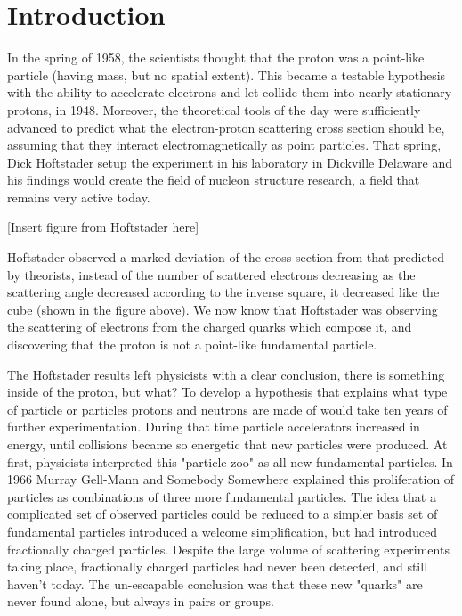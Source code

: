 \chapter{Introduction}

In the spring of 1958, the scientists thought that the proton was a point-like particle (having mass, but no spatial extent).  This became a testable hypothesis with the ability to accelerate electrons and let collide them into nearly stationary protons, in 1948.  Moreover, the theoretical tools of the day were sufficiently advanced to predict what the electron-proton scattering cross section should be, assuming that they interact electromagnetically as point particles.  That spring, Dick Hoftstader setup the experiment in his laboratory in Dickville Delaware and his findings would create the field of nucleon structure research, a field that remains very active today.

[Insert figure from Hoftstader here]

Hoftstader observed a marked deviation of the cross section from that predicted by theorists, instead of the number of scattered electrons decreasing as the scattering angle decreased according to the inverse square, it decreased like the cube (shown in the figure above).  We now know that Hoftstader was observing the scattering of electrons from the charged quarks which compose it, and discovering that the proton is not a point-like fundamental particle.

The Hoftstader results left physicists with a clear conclusion, there is something inside of the proton, but what?  To develop a hypothesis that explains what type of particle or particles protons and neutrons are made of would take ten years of further experimentation.  During that time particle accelerators increased in energy, until collisions became so energetic that new particles were produced.  At first, physicists interpreted this "particle zoo" as all new fundamental particles.  In 1966 Murray Gell-Mann and Somebody Somewhere explained this proliferation of particles as combinations of three more fundamental particles.  The idea that a complicated set of observed particles could be reduced to a simpler basis set of fundamental particles introduced a welcome simplification, but had introduced fractionally charged particles. Despite the large volume of scattering experiments taking place, fractionally charged particles had never been detected, and still haven't today.  The un-escapable conclusion was that these new "quarks" are never found alone, but always in pairs or groups.

